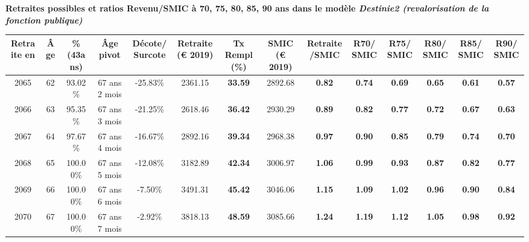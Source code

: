  \vspace{0.1cm} 
{\bf \noindent Retraites possibles et ratios Revenu/SMIC à 70, 75, 80, 85, 90 ans dans le modèle \emph{Destinie2 (revalorisation de la fonction publique)}}  
 
\begin{adjustbox}{max width=\textwidth} 
\begin{tabular}[htb]{|c|c||c|c|c||c|c||c|c||c|c|c|c|c|} 
\hline 
 Retraite en &  Âge &  \%(43ans) &  Âge pivot &  Décote/Surcote &  Retraite (\euro{} 2019) &  Tx Rempl(\%) &  SMIC (\euro{} 2019) &  Retraite/SMIC &  R70/SMIC &  R75/SMIC &  R80/SMIC &  R85/SMIC &  R90/SMIC \\ 
\hline \hline 
 2065 &  62 &  93.02\% &  67 ans 2 mois &  -25.83\% &  2361.15 &  {\bf 33.59} &  2892.68 &  {\bf {\color{red} 0.82}} &  {\bf {\color{red} 0.74}} &  {\bf {\color{red} 0.69}} &  {\bf {\color{red} 0.65}} &  {\bf {\color{red} 0.61}} &  {\bf {\color{red} 0.57}} \\ 
\hline 
 2066 &  63 &  95.35\% &  67 ans 3 mois &  -21.25\% &  2618.46 &  {\bf 36.42} &  2930.29 &  {\bf {\color{red} 0.89}} &  {\bf {\color{red} 0.82}} &  {\bf {\color{red} 0.77}} &  {\bf {\color{red} 0.72}} &  {\bf {\color{red} 0.67}} &  {\bf {\color{red} 0.63}} \\ 
\hline 
 2067 &  64 &  97.67\% &  67 ans 4 mois &  -16.67\% &  2892.16 &  {\bf 39.34} &  2968.38 &  {\bf {\color{red} 0.97}} &  {\bf {\color{red} 0.90}} &  {\bf {\color{red} 0.85}} &  {\bf {\color{red} 0.79}} &  {\bf {\color{red} 0.74}} &  {\bf {\color{red} 0.70}} \\ 
\hline 
 2068 &  65 &  100.00\% &  67 ans 5 mois &  -12.08\% &  3182.89 &  {\bf 42.34} &  3006.97 &  {\bf 1.06} &  {\bf {\color{red} 0.99}} &  {\bf {\color{red} 0.93}} &  {\bf {\color{red} 0.87}} &  {\bf {\color{red} 0.82}} &  {\bf {\color{red} 0.77}} \\ 
\hline 
 2069 &  66 &  100.00\% &  67 ans 6 mois &  -7.50\% &  3491.31 &  {\bf 45.42} &  3046.06 &  {\bf 1.15} &  {\bf 1.09} &  {\bf 1.02} &  {\bf {\color{red} 0.96}} &  {\bf {\color{red} 0.90}} &  {\bf {\color{red} 0.84}} \\ 
\hline 
 2070 &  67 &  100.00\% &  67 ans 7 mois &  -2.92\% &  3818.13 &  {\bf 48.59} &  3085.66 &  {\bf 1.24} &  {\bf 1.19} &  {\bf 1.12} &  {\bf 1.05} &  {\bf {\color{red} 0.98}} &  {\bf {\color{red} 0.92}} \\ 
\hline 
\hline 
\end{tabular} 
\end{adjustbox} 
 
